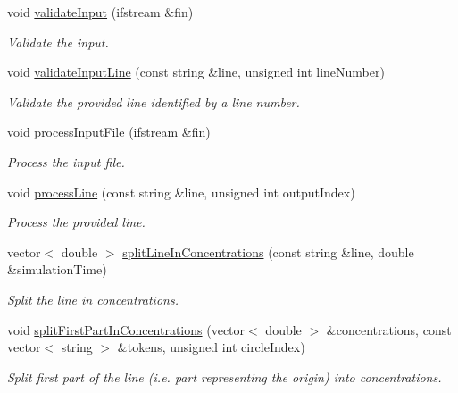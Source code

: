 \begin{DoxyCompactItemize}
void \hyperlink{classmultiscale_1_1video_1_1PolarCsvToInputFilesConverter_af612ef958fd3656f2c477d4d8e81244a}{validate\-Input} (ifstream \&fin)
\begin{DoxyCompactList}\small\item\em Validate the input. \end{DoxyCompactList}\item 
void \hyperlink{classmultiscale_1_1video_1_1PolarCsvToInputFilesConverter_a71741de958cfecc133a303ea3a5af22c}{validate\-Input\-Line} (const string \&line, unsigned int line\-Number)
\begin{DoxyCompactList}\small\item\em Validate the provided line identified by a line number. \end{DoxyCompactList}\item 
void \hyperlink{classmultiscale_1_1video_1_1PolarCsvToInputFilesConverter_a66168d7550e656dccf01a473ed2708f0}{process\-Input\-File} (ifstream \&fin)
\begin{DoxyCompactList}\small\item\em Process the input file. \end{DoxyCompactList}\item 
void \hyperlink{classmultiscale_1_1video_1_1PolarCsvToInputFilesConverter_a23c483d80d7c0c8f0510595a1ab55f69}{process\-Line} (const string \&line, unsigned int output\-Index)
\begin{DoxyCompactList}\small\item\em Process the provided line. \end{DoxyCompactList}\item 
vector$<$ double $>$ \hyperlink{classmultiscale_1_1video_1_1PolarCsvToInputFilesConverter_af2d31d32cdba42aeb5589b3faab315ad}{split\-Line\-In\-Concentrations} (const string \&line, double \&simulation\-Time)
\begin{DoxyCompactList}\small\item\em Split the line in concentrations. \end{DoxyCompactList}\item 
void \hyperlink{classmultiscale_1_1video_1_1PolarCsvToInputFilesConverter_a2ab8a181fa30c720d4ee87c188770bcc}{split\-First\-Part\-In\-Concentrations} (vector$<$ double $>$ \&concentrations, const vector$<$ string $>$ \&tokens, unsigned int circle\-Index)
\begin{DoxyCompactList}\small\item\em Split first part of the line (i.\-e. part representing the origin) into concentrations. \end{DoxyCompactList}\item 

\end{DoxyCompactItemize}
